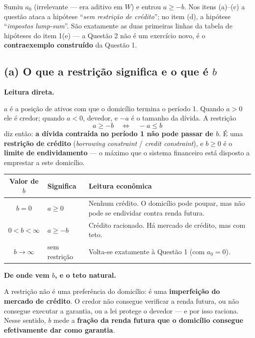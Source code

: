 \documentclass[11pt, a4paper]{article}
\newcommand{\passo}[1]{\medskip\noindent\textbf{#1}\par\nobreak}
\begin{document}
\begin{tcolorbox}[theorybox, title={Duas mudanças em relação à Questão 1, e por que elas são as duas certas}]
\small
Sumiu $a_0$ (irrelevante --- era aditivo em $W$) e entrou $a\ge-b$. Nos itens (a)--(c) a
questão ataca a hipótese ``\emph{sem restrição de crédito}''; no item (d), a hipótese
``\emph{impostos lump-sum}''. São exatamente as duas primeiras linhas da tabela de
hipóteses do item 1(e) --- a Questão 2 não é um exercício novo, é o \textbf{contraexemplo
construído} da Questão 1.
\end{tcolorbox}

\subsection*{(a) O que a restrição significa e o que é $b$}

\passo{Leitura direta.}
$a$ é a posição de ativos com que o domicílio termina o período 1. Quando $a>0$ ele é
credor; quando $a<0$, devedor, e $-a$ é o tamanho da dívida. A restrição
$$a \ge -b \quad\Longleftrightarrow\quad -a \le b$$
diz então: \textbf{a dívida contraída no período 1 não pode passar de $b$}. É uma
\textbf{restrição de crédito} (\emph{borrowing constraint} / \emph{credit constraint}), e
$b\ge0$ é o \textbf{limite de endividamento} --- o máximo que o sistema financeiro está
disposto a emprestar a este domicílio.

\begin{center}
\small
\begin{tabular}{@{}clp{8.4cm}@{}}
\toprule
\textbf{Valor de $b$} & \textbf{Significa} & \textbf{Leitura econômica} \\
\midrule
$b=0$ & $a\ge0$ & Nenhum crédito. O domicílio pode poupar, mas não pode se endividar
  contra renda futura. \\
$0<b<\infty$ & $a\ge-b$ & Crédito racionado. Há mercado de crédito, mas com teto. \\
$b\to\infty$ & sem restrição & Volta-se exatamente à Questão 1 (com $a_0=0$). \\
\bottomrule
\end{tabular}
\end{center}

\passo{De onde vem $b$, e o teto natural.}
A restrição não é uma preferência do domicílio: é uma \textbf{imperfeição do mercado de
crédito}. O credor não consegue verificar a renda futura, ou não consegue executar a
garantia, ou a lei protege o devedor --- e por isso raciona. Nesse sentido, $b$ mede a
\textbf{fração da renda futura que o domicílio consegue efetivamente dar como garantia}.
\end{document}
